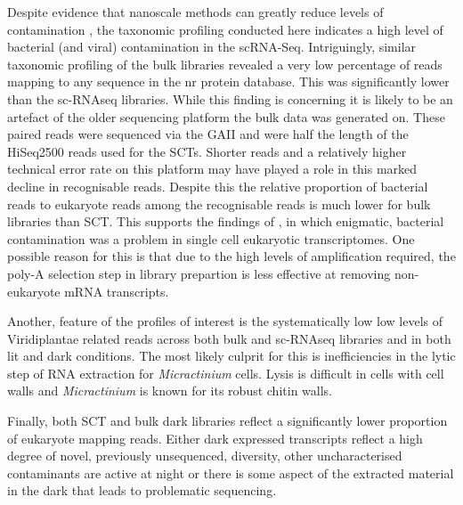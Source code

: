 Despite evidence that nanoscale methods can greatly reduce levels of contamination \citep{Blainey2011}, the taxonomic profiling conducted here
indicates a high level of bacterial (and viral) contamination in the scRNA-Seq.  Intriguingly, similar taxonomic profiling of the bulk
libraries revealed a very low percentage of reads mapping to any sequence in the nr protein database.  This was significantly lower than the
sc-RNAseq libraries.  While this finding is concerning it is likely to be an artefact of the older sequencing platform the bulk data was generated on.
These paired reads were sequenced via the GAII and were half the length of the HiSeq2500 reads used for the SCTs.  Shorter reads and a relatively higher
technical error rate on this platform may have played a role in this marked decline in recognisable reads. 
Despite this the relative proportion of bacterial reads to eukaryote reads among the recognisable reads is much lower for bulk libraries than SCT.
This supports the findings of \citep{Kolisko2014}, in which enigmatic, bacterial contamination was a problem in single cell eukaryotic
transcriptomes.   One possible reason for this is that due to the high levels of amplification required, the poly-A selection step
in library prepartion is less effective at removing non-eukaryote mRNA transcripts.




Another, feature of the profiles of interest is the systematically low 
low levels of Viridiplantae related reads across both bulk and sc-RNAseq libraries and in both lit and dark conditions.  The most likely culprit for
this is inefficiencies in the lytic step of RNA extraction for \textit{Micractinium} cells. 
Lysis is difficult in cells
with cell walls \citep{Korfhage2015} and \textit{Micractinium} is known for its robust chitin walls. 

Finally, both SCT and bulk dark libraries reflect a significantly lower proportion of eukaryote mapping reads. Either dark expressed transcripts 
reflect a high degree of novel, previously unsequenced, diversity, other uncharacterised contaminants are active at night or there is some aspect
of the extracted material in the dark that leads to problematic sequencing.  


